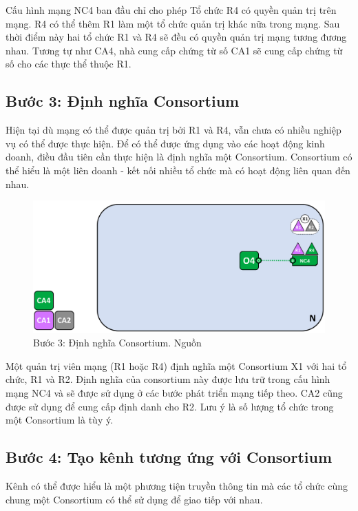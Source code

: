 \documentclass[../DoAn.tex]{subfiles}
\begin{document}
Cấu hình mạng NC4 ban đầu chỉ cho phép Tổ chức R4 có quyền quản trị trên mạng.
R4 có thể thêm R1 làm một tổ chức quản trị khác nữa trong mạng. Sau thời điểm
này hai tổ chức R1 và R4 sẽ đều có quyền quản trị mạng tương đương nhau. Tương
tự như CA4, nhà cung cấp chứng từ số CA1 sẽ cung cấp chứng từ số cho các thực
thể thuộc R1.

\subsection{Bước 3: Định nghĩa Consortium}

Hiện tại dù mạng có thể được quản trị bởi R1 và R4, vẫn chưa có nhiều nghiệp vụ
có thể được thực hiện. Để có thể được ứng dụng vào các hoạt động kinh doanh,
điều đầu tiên cần thực hiện là định nghĩa một Consortium. Consortium có thể
hiểu là một liên doanh - kết nối nhiều tổ chức mà có hoạt động liên quan đến
nhau.

\begin{figure}[h]
  \centering
  \includegraphics[width=0.75\linewidth]{Hinhve/network.diagram.3.png}
  \caption[Bước 3: Định nghĩa Consortium]{Bước 3: Định nghĩa Consortium. Nguồn \cite{fabric_architecture}}
  \label{fig:fabric_step_3}
\end{figure}

Một quản trị viên mạng (R1 hoặc R4) định nghĩa một Consortium X1 với hai tổ
chức, R1 và R2. Định nghĩa của consortium này được lưu trữ trong cấu hình mạng
NC4 và sẽ được sử dụng ở các bước phát triển mạng tiếp theo. CA2 cũng được sử
dụng để cung cấp định danh cho R2. Lưu ý là số lượng tổ chức trong một
Consortium là tùy ý.

\subsection{Bước 4: Tạo kênh tương ứng với Consortium}

Kênh có thể được hiểu là một phương tiện truyền thông tin mà các tổ chức cùng
chung một Consortium có thể sử dụng để giao tiếp với nhau.
\end{document}
